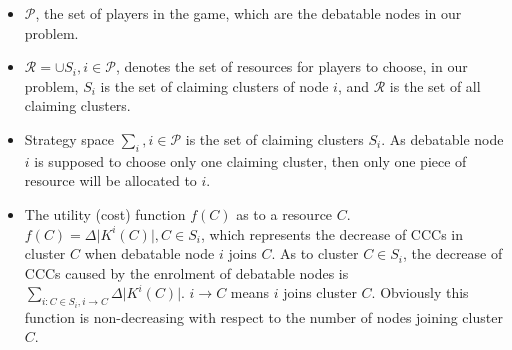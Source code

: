 \documentclass[10pt,journal,compsoc]{IEEEtran}
\theoremstyle{mytheoremstyle}
\theoremstyle{mytheoremstyle}
\theoremstyle{mytheoremstyle}
\begin{document}

\begin{itemize}
	\item $\mathcal{P}$, the set of players in the game, which are the debatable nodes in our problem.
	\item $\mathcal{R} = \cup S_i, i\in \mathcal{P}$, denotes the set of resources for players to choose, in our problem, $S_i$ is the set of claiming clusters of node $i$, and $\mathcal{R}$ is the set of all claiming clusters.
	\item Strategy space $\sum_i, i \in \mathcal{P}$ is the set of claiming clusters $S_i$.
	As debatable node $i$ is supposed to choose only one claiming cluster, then only one piece of resource will be allocated to $i$.%
	
	
	\item %
	The utility (cost) function $f(C)$ as to a resource $C$. 
	$f(C) = \Delta\vert K^i(C)|, C\in S_i$, which represents the decrease of CCCs in cluster $C$ when debatable node $i$ joins $C$.
	As to cluster $C\in S_i$, the decrease of CCCs caused by the enrolment of debatable nodes is $\sum_{i:C\in S_i, i\rightarrow C} \Delta\vert K^i(C) \vert$. 
$i\rightarrow C$ means $i$ joins cluster $C$.
Obviously this function is non-decreasing with respect to the number of nodes joining cluster $C$.
	

\end{itemize}
\end{document}

